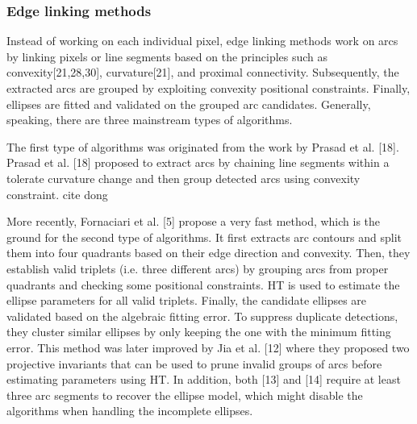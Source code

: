 \documentclass[a4paper]{report}
\begin{document}
\subsubsection{Edge linking methods}

Instead of working on each individual pixel, edge linking methods work on arcs by linking pixels or line segments based on the principles such as convexity[21,28,30], curvature[21], and proximal connectivity. Subsequently, the extracted arcs are grouped by exploiting convexity positional constraints.
Finally, ellipses are fitted and validated on the grouped arc candidates. Generally, speaking, there are three mainstream types of algorithms.


The first type of algorithms was originated from the work by Prasad et al. [18]. Prasad et al. [18] proposed to extract arcs by chaining line segments within a tolerate curvature change and then group detected arcs using convexity constraint. 
cite dong  
  

More recently, Fornaciari et al. [5] propose a very fast method, which is the ground for the second type of algorithms. It first extracts arc contours and split them into four quadrants based on their edge direction and convexity. Then, they establish valid triplets (i.e. three different arcs) by grouping arcs from proper quadrants and checking some positional constraints. HT is used to estimate the ellipse parameters for all valid triplets. Finally, the candidate ellipses are validated based on the algebraic fitting error. To suppress duplicate detections, they cluster similar ellipses by only keeping the one with the minimum fitting error. This method was later improved by Jia et al. [12] where they proposed two projective invariants that can be used to prune invalid groups of arcs before estimating parameters using HT.%
In addition, both [13] and [14] require at least three arc segments to recover the ellipse model, which might disable the algorithms when handling the incomplete ellipses.
\end{document}
